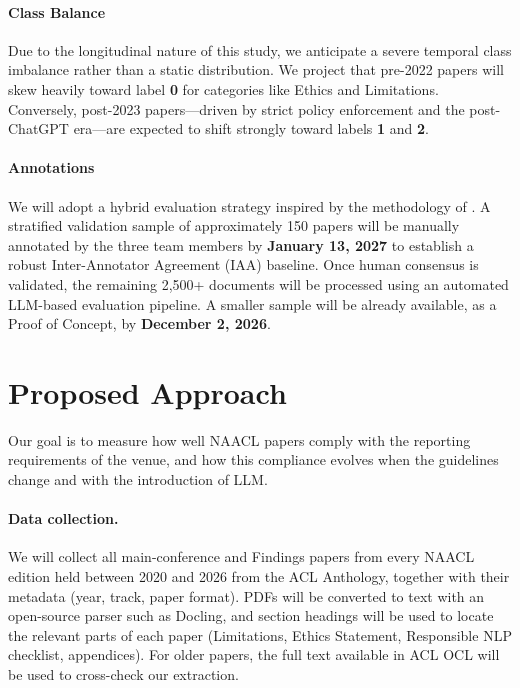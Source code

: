 \documentclass[11pt]{article}
\begin{document}
\paragraph{Class Balance}
Due to the longitudinal nature of this study, we anticipate a severe temporal class imbalance rather than a static distribution. We project that pre-2022 papers will skew heavily toward label \textbf{0} for categories like Ethics and Limitations. Conversely, post-2023 papers---driven by strict policy enforcement and the post-ChatGPT era---are expected to shift strongly toward labels \textbf{1} and \textbf{2}.
\paragraph{Annotations}
We will adopt a hybrid evaluation strategy inspired by the methodology of . A stratified validation sample of approximately 150 papers will be manually annotated by the three team members by \textbf{January 13, 2027} to establish a robust Inter-Annotator Agreement (IAA) baseline. Once human consensus is validated, the remaining 2,500+ documents will be processed using an automated LLM-based evaluation pipeline. A smaller sample will be already available, as a Proof of Concept, by \textbf{December 2, 2026}.

\section{Proposed Approach}

Our goal is to measure how well NAACL papers comply with the reporting requirements of the venue, and how this compliance evolves when the guidelines change and with the introduction of LLM. 

\paragraph{Data collection.}
We will collect all main-conference and Findings papers from every NAACL edition held between 2020 and 2026 from the ACL Anthology, together with their metadata (year, track, paper format). PDFs will be converted to text with an open-source parser such as Docling, and section headings will be used to locate the relevant parts of each paper (Limitations, Ethics Statement, Responsible NLP checklist, appendices). For older papers, the full text available in ACL OCL \cite{rohatgi2023acl} will be used to cross-check our extraction.
\end{document}
